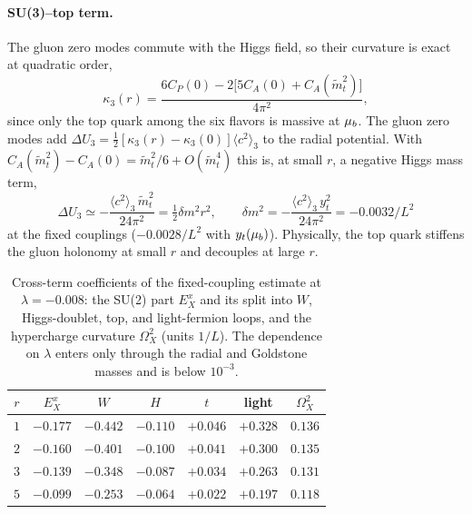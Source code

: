 \paragraph{SU(3)--top term.}
The gluon zero modes commute with the Higgs field, so their curvature is exact at quadratic order,
\begin{equation}
\kappa_3(r)=\frac{6C_P(0)-2\bigl[5C_A(0)+C_A(\tilde m_t^2)\bigr]}{4\pi^2},
\label{eq:rb-kappa3}
\end{equation}
since only the top quark among the six flavors is massive at $\mu_b$.
The gluon zero modes add $\Delta U_3=\frac12[\kappa_3(r)-\kappa_3(0)]\langle c^2\rangle_3$ to the radial potential.
With $C_A(\tilde m_t^2)-C_A(0)=\tilde m_t^2/6+O(\tilde m_t^4)$ this is, at small $r$, a negative Higgs mass term,
\begin{equation}
\Delta U_3\simeq-\frac{\langle c^2\rangle_3\,\tilde m_t^2}{24\pi^2}=\tfrac12\delta m^2r^2,\qquad
\delta m^2=-\frac{\langle c^2\rangle_3\,y_t^2}{24\pi^2}=-0.0032/L^2
\label{eq:rb-dm2}
\end{equation}
at the fixed couplings ($-0.0028/L^2$ with $y_t(\mu_b)$). %
Physically, the top quark stiffens the gluon holonomy at small $r$ and decouples at large $r$.

\begin{table}[t]
\centering
\caption{Cross-term coefficients of the fixed-coupling estimate at $\lambda=-0.008$: the SU(2) part $E_X^x$ and its split into $W$, Higgs-doublet, top, and light-fermion loops, and the hypercharge curvature $\Omega_X^2$ (units $1/L$).
The dependence on $\lambda$ enters only through the radial and Goldstone masses and is below $10^{-3}$.} %
\label{tab:rb-hessian}
\begin{tabular}{ccccccc}
\toprule
$r$ & $E_X^x$ & $W$ & $H$ & $t$ & light & $\Omega_X^2$ \\
\midrule
$1$ & $-0.177$ & $-0.442$ & $-0.110$ & $+0.046$ & $+0.328$ & $0.136$ \\ %
$2$ & $-0.160$ & $-0.401$ & $-0.100$ & $+0.041$ & $+0.300$ & $0.135$ \\ %
$3$ & $-0.139$ & $-0.348$ & $-0.087$ & $+0.034$ & $+0.263$ & $0.131$ \\ %
$5$ & $-0.099$ & $-0.253$ & $-0.064$ & $+0.022$ & $+0.197$ & $0.118$ \\ %
\bottomrule
\end{tabular}
\end{table}


